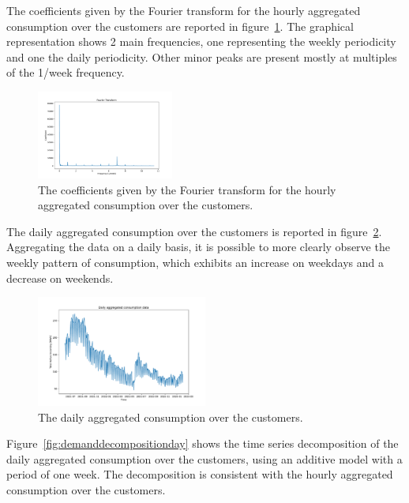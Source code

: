 The coefficients given by the Fourier transform for the hourly aggregated consumption over the customers are reported in figure~\ref{fig:demandft}.
The graphical representation shows 2 main frequencies, one representing the weekly periodicity and one the daily periodicity.
Other minor peaks are present mostly at multiples of the 1/week frequency.

\begin{figure}[H]
\centering
\includegraphics[width=0.4\textwidth]{images/demand/ft_hour_week}
\caption{The coefficients given by the Fourier transform for the hourly aggregated consumption over the customers.}
\label{fig:demandft}
\end{figure}

The daily aggregated consumption over the customers is reported in figure~\ref{fig:demanddataplotday}.
Aggregating the data on a daily basis, it is possible to more clearly observe the weekly pattern of consumption, which exhibits an increase on weekdays and a decrease on weekends.

\begin{figure}[H]
\centering
\includegraphics[width=0.5\textwidth]{images/demand/data_day_aggregated_plot}
\caption{The daily aggregated consumption over the customers.}
\label{fig:demanddataplotday}
\end{figure}

Figure~\ref{fig:demanddecompositionday} shows the time series decomposition of the daily aggregated consumption over the customers, using an additive model with a period of one week.
The decomposition is consistent with the hourly aggregated consumption over the customers.

